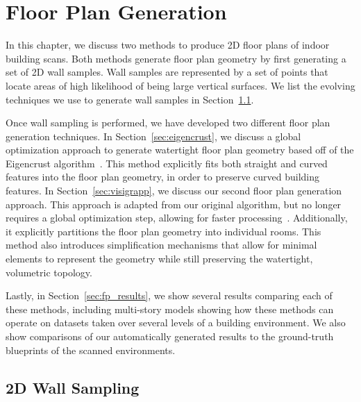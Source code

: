 \documentclass[12pt,onecolumn,oneside]{book}
\begin{document}

\chapter{Floor Plan Generation}
\label{ch:floorplan}

In this chapter, we discuss two methods to produce 2D floor plans of indoor building scans.  Both methods generate floor plan geometry by first generating a set of 2D wall samples.  Wall samples are represented by a set of points that locate areas of high likelihood of being large vertical surfaces.  We list the evolving techniques we use to generate wall samples in Section~\ref{sec:wall_sampling}.

Once wall sampling is performed, we have developed two different floor plan generation techniques.  In Section~\ref{sec:eigencrust}, we discuss a global optimization approach to generate watertight floor plan geometry based off of the Eigencrust algorithm~\cite{EigencrustShewchuk,Turner12}.  This method explicitly fits both straight and curved features into the floor plan geometry, in order to preserve curved building features.  In Section~\ref{sec:visigrapp}, we discuss our second floor plan generation approach.  This approach is adapted from our original algorithm, but no longer requires a global optimization step, allowing for faster processing~\cite{Turner14}.  Additionally, it explicitly partitions the floor plan geometry into individual rooms.  This method also introduces simplification mechanisms that allow for minimal elements to represent the geometry while still preserving the watertight, volumetric topology.

Lastly, in Section~\ref{sec:fp_results}, we show several results comparing each of these methods, including multi-story models showing how these methods can operate on datasets taken over several levels of a building environment.  We also show comparisons of our automatically generated results to the ground-truth blueprints of the scanned environments.

\section{2D Wall Sampling}
\label{sec:wall_sampling}
\end{document}
